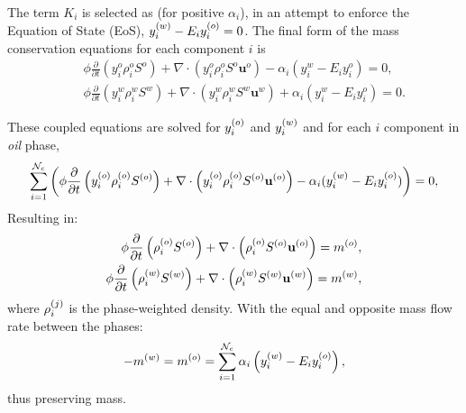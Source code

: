 The term $K_{i}$ is selected as  (for positive $\alpha_{i}$), in an attempt to enforce the Equation of State (EoS),  $\mfr[y]{i}{w} - E_i \mfr[y]{i}{o}=0$.  The final form of the mass conservation equations for each component $i$ is 
           \begin{eqnarray}
               && \phi  \displaystyle\frac{\partial}{\partial t}\left(y_{i}^{o}\rho_i^{o}S^{o} \right) + \nabla\cdot\left(y_{i}^{o}\rho_i^{o}S^{o}\mathbf{u}^{o}  \right) - \alpha_i (y_i^w - E_i y_i^o)  = 0, \label{oil-comp-i} \nonumber\\
               && \phi \displaystyle\frac{\partial}{\partial t}\left(y_{i}^{w}\rho_i^{w}S^{w}  \right) +  \nabla\cdot\left( y_{i}^{w}\rho_i^{w}S^{w}\mathbf{u}^{w}  \right) + \alpha_i (y_i^w - E_i y_i^o) = 0. \label{water-comp-i} \nonumber\label{Chapter:TransportModel:Section:MultiComponentFormulation:Section:2PhaseSystem:Eqn:MassConservationSaturation}
           \end{eqnarray}

These coupled equations are solved for $\mfr[y]{i}{o}$ and $\mfr[y]{i}{w}$ and for each $i$ component in {\it oil} phase, 
           \begin{equation}
              \summation_{i=1}^{{\cal N}_{c}} \bigg(\phi \displaystyle\frac{\partial}{\partial t}\left(\mfr[y]{i}{o}\mfr[\rho]{i}{o}\mfr[S]{}{o} \right) + \nabla\cdot\left(\mfr[y]{i}{o}\mfr[\rho]{i}{o}\mfr[S]{}{o}\mfr[\mathbf{u}]{}{o}  \right) - \alpha_i (\mfr[y]{i}{w} - E_i \mfr[y]{i}{o})\bigg)  = 0, 
           \end{equation}
Resulting in:
           \begin{eqnarray}
              \phi \displaystyle\frac{\partial}{\partial t}\left( \mfr[\rho]{i}{o}\mfr[S]{}{o} \right) + \nabla\cdot\left(\mfr[\rho]{i}{o}\mfr[S]{}{o}\mfr[\mathbf{u}]{}{o}  \right) = \mfr[m]{}{o}, \nonumber \\
              \phi \displaystyle\frac{\partial}{\partial t}\left( \mfr[\rho]{i}{w}\mfr[S]{}{w} \right) + \nabla\cdot\left(\mfr[\rho]{i}{w}\mfr[S]{}{w}\mfr[\mathbf{u}]{}{w}  \right) = \mfr[m]{}{w}, \nonumber 
           \end{eqnarray}
where $\mfr[\rho]{i}{j}$ is the phase-weighted density. With the equal and opposite mass flow rate between the phases: 
           \begin{displaymath}
                -\mfr[m]{}{w} = \mfr[m]{}{o}= \summation_{i=1}^{{\cal N}_{c}}\alpha_i \left(\mfr[y]{i}{w} - E_i \mfr[y]{i}{o}\right), 
           \end{displaymath}
thus preserving mass.


